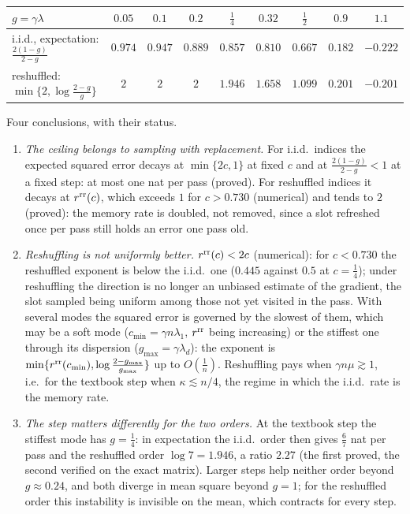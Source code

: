 \begin{center}
\footnotesize
\begin{tabular}{@{}lcccccccc@{}}
\toprule
$g=\gamma\lambda$ & $0.05$ & $0.1$ & $0.2$ & $\frac14$ & $0.32$ & $\frac12$ & $0.9$ & $1.1$ \\
\midrule
i.i.d., expectation: $\frac{2(1-g)}{2-g}$ & $0.974$ & $0.947$ & $0.889$ & $0.857$ & $0.810$ & $0.667$ & $0.182$ & $-0.222$ \\
reshuffled: $\min\{2,\log\frac{2-g}g\}$ & $2$ & $2$ & $2$ & $1.946$ & $1.658$ & $1.099$ & $0.201$ & $-0.201$ \\
\bottomrule
\end{tabular}
\end{center}
\noindent Four conclusions, with their status.
\begin{enumerate}[label=(\arabic*),nosep]
\item \emph{The ceiling belongs to sampling with replacement.} For i.i.d.\ indices the expected squared error decays at $\min\{2c,1\}$ at fixed $c$ and at $\frac{2(1-g)}{2-g}<1$ at a fixed step: at most one nat per pass (proved). For reshuffled indices it decays at $r^{\rm rr}(c)$, which exceeds $1$ for $c>0.730$ (numerical) and tends to $2$ (proved): the memory rate is doubled, not removed, since a slot refreshed once per pass still holds an error one pass old.
\item \emph{Reshuffling is not uniformly better.} $r^{\rm rr}(c)<2c$ (numerical): for $c<0.730$ the reshuffled exponent is below the i.i.d.\ one ($0.445$ against $0.5$ at $c=\frac14$); under reshuffling the direction is no longer an unbiased estimate of the gradient, the slot sampled being uniform among those not yet visited in the pass. With several modes the squared error is governed by the slowest of them, which may be a soft mode ($c_{\min}=\gamma n\lambda_1$, $r^{\rm rr}$ being increasing) or the stiffest one through its dispersion ($g_{\max}=\gamma\lambda_d$): the exponent is $\min\{r^{\rm rr}(c_{\min}),\log\frac{2-g_{\max}}{g_{\max}}\}$ up to $O(\frac1n)$. Reshuffling pays when $\gamma n\mu\gtrsim1$, i.e.\ for the textbook step when $\kappa\lesssim n/4$, the regime in which the i.i.d.\ rate is the memory rate.
\item \emph{The step matters differently for the two orders.} At the textbook step the stiffest mode has $g=\frac14$: in expectation the i.i.d.\ order then gives $\frac67$ nat per pass and the reshuffled order $\log7=1.946$, a ratio $2.27$ (the first proved, the second verified on the exact matrix). Larger steps help neither order beyond $g\approx0.24$, and both diverge in mean square beyond $g=1$; for the reshuffled order this instability is invisible on the mean, which contracts for every step.

\end{enumerate}

